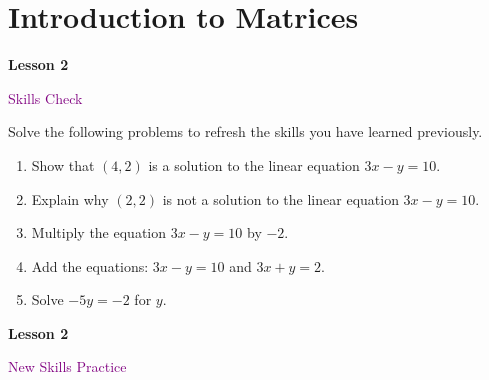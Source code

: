 \documentclass[10pt]{book}
\theoremstyle{definition}
\theoremstyle{remark}
\begin{document}
\section{Introduction to Matrices}
\begin{tcolorbox}[
  width=\textwidth,
  colback=gray!10, %
  colframe=white, %
  boxrule=0pt,    %
  left=1cm,       %
  right=1cm,      %
  sharp corners  %
]

\begin{minipage}[t]{0.5\textwidth}
  \Huge \textbf{Lesson 2}
\end{minipage}%
\hfill
\begin{minipage}[t]{0.5\textwidth}
  \Huge \textcolor{purple}{Skills Check}
\end{minipage}
\end{tcolorbox}

\begin{large}
\noindent
Solve the following problems to refresh the skills you have learned previously.
\begin{enumerate}
\item Show that $(4,2)$ is a solution to the linear equation $3x-y=10$.\vfil \vfil \vfil
\item Explain why $(2,2)$ is not a solution to the linear equation $3x-y=10$.\vfil \vfil \vfil
\item Multiply the equation $3x-y=10$ by $-2$.\vfil \vfil\vfil
\item Add the equations: $3x-y=10$ and $3x+y=2$.\vfil \vfil \vfil
\item Solve $-5y = -2$ for $y$.\vfil \vfil \vfil
\end{enumerate}
\end{large}
\newpage


\begin{tcolorbox}[
  width=\textwidth,
  colback=gray!10, %
  colframe=white, %
  boxrule=0pt,    %
  left=1cm,       %
  right=1cm,      %
  sharp corners  %
]

\begin{minipage}[t]{0.5\textwidth}
  \Huge \textbf{Lesson 2}
\end{minipage}%
\hfill
\begin{minipage}[t]{0.5\textwidth}
  \Huge\textcolor{purple}{New Skills Practice}
\end{minipage}
\end{tcolorbox}
\end{document}
